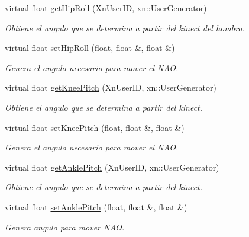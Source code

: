 \begin{DoxyCompactItemize}
\item 
virtual float \hyperlink{class_l_leg_ac0d2147e72701ad8202b758bb572735f}{get\-Hip\-Roll} (Xn\-User\-I\-D, xn\-::\-User\-Generator)
\begin{DoxyCompactList}\small\item\em Obtiene el angulo que se determina a partir del kinect del hombro. \end{DoxyCompactList}\item 
\hypertarget{class_l_leg_a200afc21f99236f2af57b95ea648573b}{virtual float \hyperlink{class_l_leg_a200afc21f99236f2af57b95ea648573b}{set\-Hip\-Roll} (float, float \&, float \&)}\label{class_l_leg_a200afc21f99236f2af57b95ea648573b}

\begin{DoxyCompactList}\small\item\em Genera el angulo necesario para mover el N\-A\-O. \end{DoxyCompactList}\item 
\hypertarget{class_l_leg_a4a31233e6def8edde81e5d694b7e0feb}{virtual float \hyperlink{class_l_leg_a4a31233e6def8edde81e5d694b7e0feb}{get\-Knee\-Pitch} (Xn\-User\-I\-D, xn\-::\-User\-Generator)}\label{class_l_leg_a4a31233e6def8edde81e5d694b7e0feb}

\begin{DoxyCompactList}\small\item\em Obtiene el angulo que se determina a partir del kinect. \end{DoxyCompactList}\item 
\hypertarget{class_l_leg_a15417e9792bbc9a2f398ed9127e3db11}{virtual float \hyperlink{class_l_leg_a15417e9792bbc9a2f398ed9127e3db11}{set\-Knee\-Pitch} (float, float \&, float \&)}\label{class_l_leg_a15417e9792bbc9a2f398ed9127e3db11}

\begin{DoxyCompactList}\small\item\em Genera el angulo necesario para mover el N\-A\-O. \end{DoxyCompactList}\item 
\hypertarget{class_l_leg_a85ec581c8db5d113a13be644a851753e}{virtual float \hyperlink{class_l_leg_a85ec581c8db5d113a13be644a851753e}{get\-Ankle\-Pitch} (Xn\-User\-I\-D, xn\-::\-User\-Generator)}\label{class_l_leg_a85ec581c8db5d113a13be644a851753e}

\begin{DoxyCompactList}\small\item\em Obtiene el angulo que se determina a partir del kinect. \end{DoxyCompactList}\item 
\hypertarget{class_l_leg_ab474375cb60e68fbf5790459b690b42f}{virtual float \hyperlink{class_l_leg_ab474375cb60e68fbf5790459b690b42f}{set\-Ankle\-Pitch} (float, float \&, float \&)}\label{class_l_leg_ab474375cb60e68fbf5790459b690b42f}

\begin{DoxyCompactList}\small\item\em Genera angulo para mover N\-A\-O. \end{DoxyCompactList}\end{DoxyCompactItemize}


